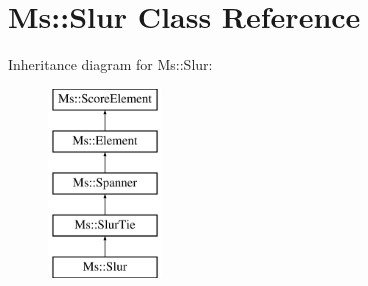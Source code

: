 \hypertarget{class_ms_1_1_slur}{}\section{Ms\+:\+:Slur Class Reference}
\label{class_ms_1_1_slur}
Inheritance diagram for Ms\+:\+:Slur\+:\begin{figure}[H]
\begin{center}
\leavevmode
\includegraphics[height=5.000000cm]{class_ms_1_1_slur}
\end{center}
\end{figure}
